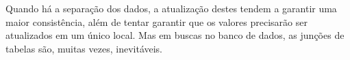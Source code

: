
Quando há a separação dos dados, a atualização destes tendem a garantir uma maior consistência, além de tentar garantir que os valores precisarão ser atualizados em um único local. Mas em buscas no banco de dados, as junções de tabelas são, muitas vezes, inevitáveis.

